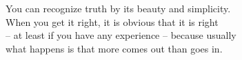 \documentclass[preview]{standalone}
\begin{document}
\begin{flushleft}
You can recognize truth by its beauty and simplicity.\\When you get it right, it is obvious that it is right\\– at least if you have any experience – because usually\\what happens is that more comes out than goes in.
\end{flushleft}
\end{document}
